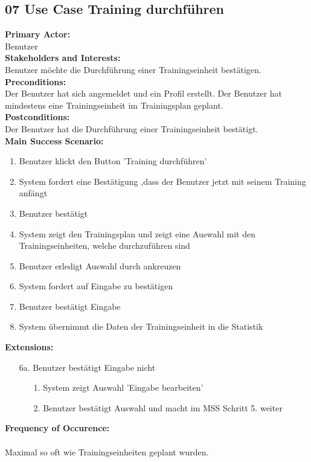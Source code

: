 \documentclass[12pt,a4paper,onecolumn]{article}
\begin{document}
\subsection{07 Use Case Training durchführen}
\textbf{Primary Actor:}\\ Benutzer\\
\textbf{Stakeholders and Interests:}\\
Benutzer möchte die Durchführung einer \gls{Trainingseinheit} bestätigen.\\
\textbf{Preconditions:} \\  Der Benutzer hat sich angemeldet und ein Profil erstellt. Der Benutzer hat mindestens eine \gls{Trainingseinheit} im \gls{Trainingsplan} geplant. \\
\textbf{Postconditions:}\\Der Benutzer hat die Durchführung einer \gls{Trainingseinheit} bestätigt.\\
\textbf{Main Success Scenario:}
\begin{enumerate}
    \item Benutzer klickt den Button 'Training durchführen'
    \item System fordert eine Bestätigung ,dass der Benutzer jetzt mit seinem Training anfängt
    \item Benutzer bestätigt
    \item System zeigt den \gls{Trainingsplan} und zeigt eine Auswahl mit den \gls{Trainingseinheit}en, welche durchzuführen sind
    \item Benutzer erledigt Auswahl durch ankreuzen
    \item System fordert auf Eingabe zu bestätigen
    \item Benutzer bestätigt Eingabe
    \item System übernimmt die Daten der \gls{Trainingseinheit} in die Statistik
\end{enumerate}
\textbf{Extensions:}
\begin{enumerate}
    \item [6a.]  Benutzer bestätigt Eingabe nicht
    \begin{enumerate}
        \item[1.]System zeigt Auswahl 'Eingabe bearbeiten'
        \item[2.]Benutzer bestätigt Auswahl und macht im MSS Schritt 5. weiter
    \end{enumerate}
\end{enumerate}
\textbf{Frequency of Occurence:}\\ \\
Maximal so oft wie \gls{Trainingseinheit}en geplant wurden. 
\end{document}

